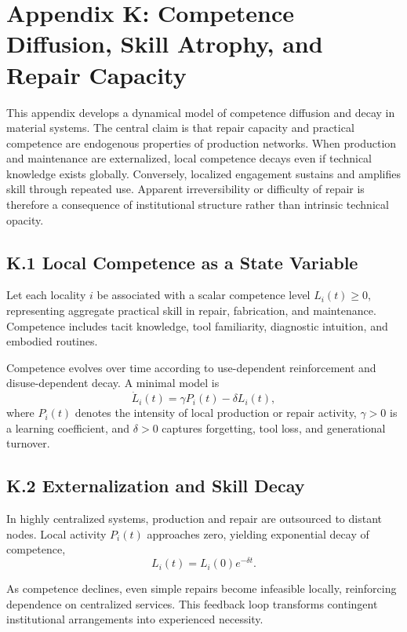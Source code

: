 \documentclass[11pt]{article}
\begin{document}
\section{Appendix K: Competence Diffusion, Skill Atrophy, and Repair Capacity}
\label{app:repair-detailed}

This appendix develops a dynamical model of competence diffusion and decay in material systems. The central claim is that repair capacity and practical competence are endogenous properties of production networks. When production and maintenance are externalized, local competence decays even if technical knowledge exists globally. Conversely, localized engagement sustains and amplifies skill through repeated use. Apparent irreversibility or difficulty of repair is therefore a consequence of institutional structure rather than intrinsic technical opacity.

\subsection{K.1 Local Competence as a State Variable}

Let each locality \(i\) be associated with a scalar competence level \(L_i(t) \ge 0\), representing aggregate practical skill in repair, fabrication, and maintenance. Competence includes tacit knowledge, tool familiarity, diagnostic intuition, and embodied routines.

Competence evolves over time according to use-dependent reinforcement and disuse-dependent decay. A minimal model is
\[
\dot{L}_i(t) = \gamma P_i(t) - \delta L_i(t),
\]
where \(P_i(t)\) denotes the intensity of local production or repair activity, \(\gamma > 0\) is a learning coefficient, and \(\delta > 0\) captures forgetting, tool loss, and generational turnover.

\subsection{K.2 Externalization and Skill Decay}

In highly centralized systems, production and repair are outsourced to distant nodes. Local activity \(P_i(t)\) approaches zero, yielding exponential decay of competence,
\[
L_i(t) = L_i(0)e^{-\delta t}.
\]

As competence declines, even simple repairs become infeasible locally, reinforcing dependence on centralized services. This feedback loop transforms contingent institutional arrangements into experienced necessity.
\end{document}
